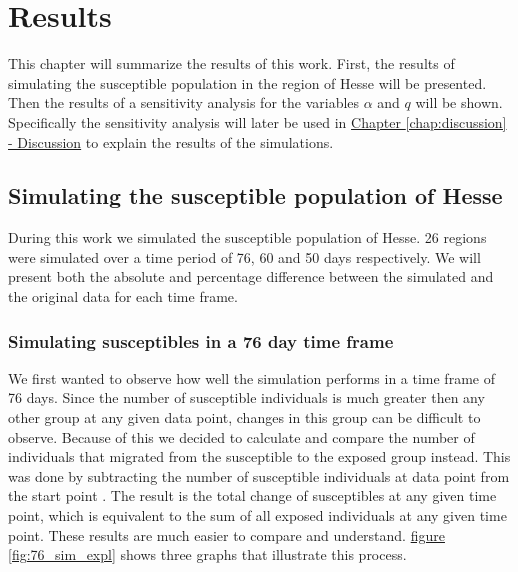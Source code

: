 
\chapter{Results} %
\label{chap:results} %
This chapter will summarize the results of this work. First, the results of simulating the susceptible population
in the region of Hesse will be presented. Then the results of a sensitivity analysis for the variables $\alpha$ and
$q$ will be shown. Specifically the sensitivity analysis will later be used in \hyperref[chap:discussion]{Chapter
\ref*{chap:discussion} - Discussion} to explain the results of the simulations.



\section{Simulating the susceptible population of Hesse}
During this work we simulated the susceptible population of Hesse. 26 regions were simulated over a time period of
76, 60 and 50 days respectively. We will present both the absolute and percentage difference between the simulated
and the original data for each time frame.

\subsection{Simulating susceptibles in a 76 day time frame}
We first wanted to observe how well the simulation performs in a time frame of 76 days. Since the number of susceptible
individuals is much greater then any other group at any given data point, changes in this group can be difficult to
observe. Because of this we decided to calculate and compare the number of individuals that migrated from the susceptible
to the exposed group instead. This was done by subtracting the number of susceptible individuals at data point  from
the start point . The result is the total change of susceptibles at any given time point, which is equivalent to the 
sum of all exposed individuals at any given time point. These results are much easier to compare and understand.
\hyperref[fig:76_sim_expl]{figure \ref*{fig:76_sim_expl}} shows three graphs that illustrate this process.


